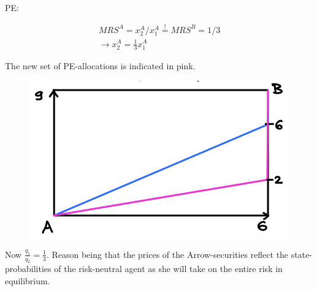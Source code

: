 {{\begin{enumerate}[label=(\alph*)]
{PE:

\begin{align*}
    M R S^{A}=x_{2}^{A} / x_{1}^{A} \stackrel{!}{=} M R S^{B}=1 / 3 \\
    \longrightarrow x_{2}^{A}=\frac{1}{3} x_{1}^{A}
\end{align*}

The new set of PE-allocations is indicated in pink.

\begin{figure}[!htp]
    \centering
    \includegraphics[width=.75\textwidth]{images/2020_21_4.png}
\end{figure}

Now $\frac{q_{1}}{q_{2}}=\frac{1}{3}$. Reason being that the prices of the Arrow-securities reflect the state-probabilities of the risk-neutral agent as she will take on the entire risk in equilibrium.
}
\end{enumerate}
}
}